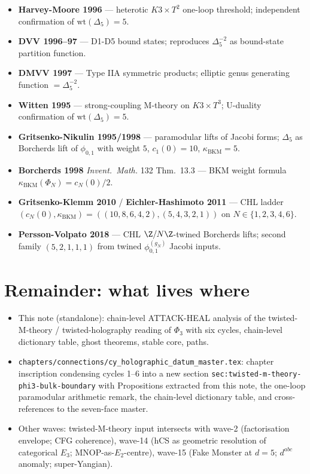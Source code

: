 \begin{itemize}
of holomorphic twists on a K\"ahler manifold.
\item \textbf{Harvey-Moore 1996} --- heterotic $K3 \times T^2$ one-loop
threshold; independent confirmation of $\mathrm{wt}(\Delta_5) = 5$.
\item \textbf{DVV 1996--97} --- D1-D5 bound states; reproduces
$\Delta_5^{-2}$ as bound-state partition function.
\item \textbf{DMVV 1997} --- Type IIA symmetric products; elliptic
genus generating function $= \Delta_5^{-2}$.
\item \textbf{Witten 1995} --- strong-coupling M-theory on
$K3 \times T^3$; U-duality confirmation of $\mathrm{wt}(\Delta_5) = 5$.
\item \textbf{Gritsenko-Nikulin 1995/1998} --- paramodular lifts of
Jacobi forms; $\Delta_5$ as Borcherds lift of $\phi_{0,1}$ with
weight $5$, $c_1(0) = 10$, $\kappa_{\mathrm{BKM}} = 5$.
\item \textbf{Borcherds 1998} \emph{Invent.\ Math.} 132 Thm.~13.3 ---
BKM weight formula $\kappa_{\mathrm{BKM}}(\Phi_N) = c_N(0)/2$.
\item \textbf{Gritsenko-Klemm 2010} / \textbf{Eichler-Hashimoto 2011}
--- CHL ladder $(c_N(0), \kappa_{\mathrm{BKM}}) = ((10, 8, 6, 4, 2),
(5, 4, 3, 2, 1))$ on $N \in \{1, 2, 3, 4, 6\}$.
\item \textbf{Persson-Volpato 2018} --- CHL $\Z/N\Z$-twined Borcherds
lifts; second family $(5, 2, 1, 1, 1)$ from twined $\phi^{(g_N)}_{0, 1}$
Jacobi inputs.
\end{itemize}

\section*{Remainder: what lives where}

\begin{itemize}
\item This note (standalone): chain-level ATTACK-HEAL analysis of the
twisted-M-theory / twisted-holography reading of $\Phi_3$ with six
cycles, chain-level dictionary table, ghost theorems, stable core,
paths.
\item \texttt{chapters/connections/cy\_holographic\_datum\_master.tex}:
chapter inscription condensing cycles 1--6 into a new section
\texttt{sec:twisted-m-theory-phi3-bulk-boundary} with Propositions
extracted from this note, the one-loop paramodular arithmetic
remark, the chain-level dictionary table, and cross-references to
the seven-face master.
\item Other waves: twisted-M-theory input intersects with wave-2
(factorisation envelope; CFG coherence), wave-14 (hCS as geometric
resolution of categorical $E_3$; MNOP-as-$E_2$-centre), wave-15
(Fake Monster at $d = 5$; $d^{abc}$ anomaly; super-Yangian).
\end{itemize}

